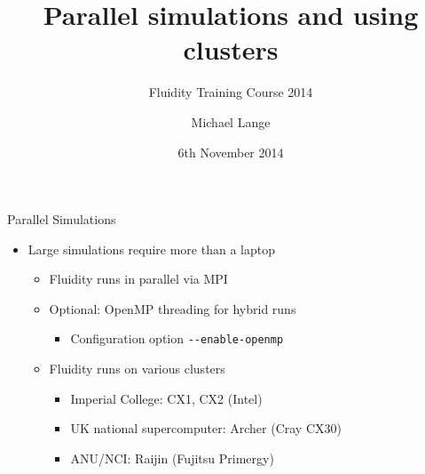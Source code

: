 \documentclass[t, hyperref={pdfpagelabels=false}]{beamer}
\title[Parallel Simulations]{Parallel simulations and using clusters}
\subtitle[]{Fluidity Training Course 2014}
\author[M. Lange]{\footnotesize Michael Lange}
\institute{AMCG, Imperial College London}
\date{\footnotesize 6th November 2014}
\begin{document}
\titlepage

\begin{frame}{Parallel Simulations}
  \begin{itemize}
  \item[] Large simulations require more than a laptop
    \begin{itemize}
      \vspace{1em}
    \item Fluidity runs in parallel via MPI
    \item Optional: OpenMP threading for hybrid runs
      \begin{itemize}
      \item Configuration option \lstinline+--enable-openmp+
      \end{itemize}

      \vspace{1em}
    \item Fluidity runs on various clusters
      \begin{itemize}
      \item Imperial College: CX1, CX2 (Intel)
      \item UK national supercomputer: Archer (Cray CX30)
      \item ANU/NCI: Raijin (Fujitsu Primergy)
      \end{itemize}
    \end{itemize}
  \end{itemize}
\end{frame}
\end{document}
